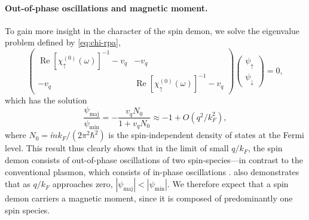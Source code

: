 \documentclass[aps,prl,reprint,twocolumns,superscriptaddress]{revtex4-2}
\DeclareMathOperator{\Ree}{Re}
\newcommand{\mdos}{\tilde{m}}
\newcommand{\kF}{k_{F}}
\begin{document}
	\paragraph{Out-of-phase oscillations and magnetic moment. }To gain more insight in the character of the spin demon, we solve the eigenvalue problem defined by \cref{eq:chi-rpa}, 
	\begin{equation}
		\begin{pmatrix}
			\Ree[\chi_{\uparrow}^{(0)}(\omega)]^{-1}-v_q & -v_q \\
			-v_q & \Ree[\chi_{\uparrow}^{(0)}(\omega)]^{-1}-v_q
		\end{pmatrix}\begin{pmatrix}
			\psi_\uparrow \\ \psi_\downarrow
		\end{pmatrix} =0,
	\end{equation}
	which has the solution
	\begin{equation}
		\frac{\psi_{{\mathrm{maj}}}}{\psi_{{\mathrm{min}}}} = -\frac{v_qN_0}{1 + v_qN_0}\approx -1 + O(q^2/\kF^2) \label{eq:out-of-phase},
	\end{equation} 
	where $N_0=\mdos \kF / (2\pi^2\hbar^2)$ is the spin-independent density of states at the Fermi level.
	This result thus clearly shows that in the limit of small $q/\kF$, the spin demon consists of out-of-phase oscillations of two spin-species---in contrast to the conventional plasmon, which consists of in-phase oscillations \cite{agarwalLonglivedSpinPlasmons2014}.  also demonstrates that as $q/\kF$ approaches zero, $|{\psi_{{\mathrm{maj}}}}| < |{\psi_{{\mathrm{min}}}}|$. We therefore expect that a spin demon carriers a magnetic moment, since it is composed of predominantly one spin species. 
	
\end{document}
